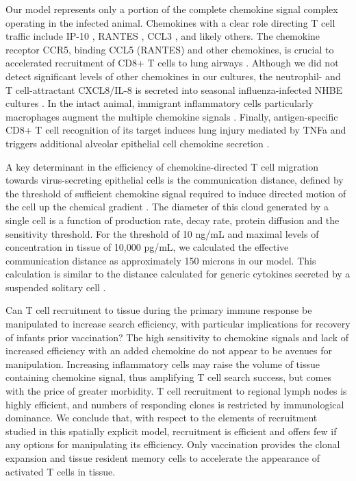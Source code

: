 \documentclass[10pt]{article}
\begin{document}
Our model represents only a portion of the complete chemokine signal complex operating in the infected animal.  Chemokines with a clear role directing T cell traffic include IP-10 \cite{Dufour2002}, RANTES \cite{Kawai1999}, CCL3 \cite{Kawai1999}, and likely others.  The chemokine receptor CCR5, binding CCL5 (RANTES) and other chemokines, is crucial to accelerated recruitment of CD8+ T cells to lung airways \cite{Kohlmeier2008}.  Although we did not detect significant levels of other chemokines in our cultures, the neutrophil- and T cell-attractant CXCL8/IL-8 is secreted into seasonal influenza-infected NHBE cultures \cite{Matsukura1996, Arndt2002}.  In the intact animal, immigrant inflammatory cells particularly macrophages augment the multiple chemokine signals \cite{Julkunen2000}.  Finally, antigen-specific CD8+ T cell recognition of its target induces lung injury mediated by TNFa and triggers additional alveolar epithelial cell chemokine secretion \cite{Zhao2000}.

A key determinant in the efficiency of chemokine-directed T cell migration towards virus-secreting epithelial cells is the communication distance, defined by the threshold of sufficient chemokine signal required to induce directed motion of the cell up the chemical gradient \cite{Thelen2008}.  The diameter of this cloud generated by a single cell is a function of production rate, decay rate, protein diffusion and the sensitivity threshold.  For the threshold of 10 ng/mL and maximal levels of concentration in tissue of 10,000 pg/mL, we calculated the effective communication distance as approximately 150 microns in our model.  This calculation is similar to the distance calculated for generic cytokines secreted by a suspended solitary cell \cite{Francis1997}.

Can T cell recruitment to tissue during the primary immune response be manipulated to increase search efficiency, with particular implications for recovery of infants prior vaccination?  The high sensitivity to chemokine signals and lack of increased efficiency with an added chemokine do not appear to be avenues for manipulation. Increasing inflammatory cells may raise the volume of tissue containing chemokine signal, thus amplifying T cell search success, but comes with the price of greater morbidity. T cell recruitment to regional lymph nodes is highly efficient, and numbers of responding clones is restricted by immunological dominance. We conclude that, with respect to the elements of recruitment studied in this spatially explicit model, recruitment is efficient and offers few if any options for manipulating its efficiency. Only vaccination provides the clonal expansion and tissue resident memory cells to accelerate the appearance of activated T cells in tissue.
\end{document}
